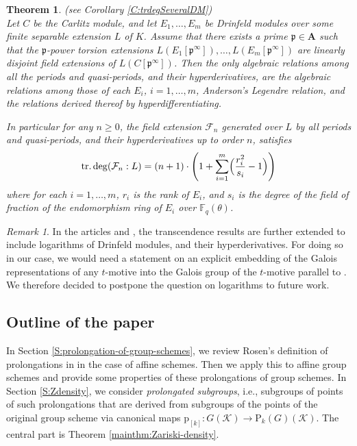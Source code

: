 \documentclass[10pt,a4paper]{amsart}
\theoremstyle{plain} %
\newtheorem{maintheorem}{Theorem}
\theoremstyle{definition}
\theoremstyle{remark}
\newtheorem{Remark}[Theorem]{Remark}
\newcommand{\FF}{\mathbb{F}}
\newcommand{\cK}{\mathcal{K}}   %
\newcommand{\fp}{\mathfrak{p}}  %
\newcommand{\bA}{\mathbf{A}}
\newcommand{\rP}[1]{\mathrm{P}_{\!#1}}
\newcommand{\Fq}{\FF_{\!q}}  %
\newcommand{\trdeg}{\operatorname{tr.deg}}
\newcommand{\prol}[1]{\mathrm{p}_{[#1]}}
\numberwithin{equation}{subsection}
\begin{document}
\begin{maintheorem} (see Corollary \ref{C:trdegSeveralDM})\\ \label{mainthm:severalDMs}
    Let $C$ be the Carlitz module, and let $E_1, \ldots, E_m$ be Drinfeld modules over some finite separable extension $L$ of $K$. Assume that there exists a prime $\fp \in \bA$ such that the $\fp$-power torsion extensions $L(E_1[\fp^\infty]),\dots, L(E_m[\fp^\infty])$ are linearly disjoint field extensions of $L(C[\fp^\infty])$. 
    Then the only algebraic relations among all the periods and quasi-periods, and their hyperderivatives, are the algebraic relations among those of each $E_i$, $i=1,\dots, m$, Anderson's Legendre relation, and the relations derived thereof by hyperdifferentiating.
    
    In particular for any $n\geq 0$, the field extension $\mathcal{F}_n$ generated over $L$ by all periods and quasi-periods, and their hyperderivatives up to order $n$, satisfies
    \[ \trdeg(\mathcal{F}_n:L) = (n+1)\cdot \left( 1 + \sum_{i=1}^m \Bigl(\frac{r_i^2}{s_i} -1 \Bigr) \right) \]
    where for each $i=1,\ldots, m$, $r_i$ is the rank of $E_i$, and $s_i$ is the degree of the field of fraction of the endomorphism ring of $E_i$ over $\Fq(\theta)$.
\end{maintheorem}





\begin{Remark}
    In the articles \cite{cc-mp:aipldm} and \cite{cn:arhpldm}, the transcendence results are further extended to include logarithms of Drinfeld modules, and their hyperderivatives.
    For doing so in our case, we would need a statement on an explicit embedding of the Galois representations of any $t$-motive into the Galois group of the $t$-motive parallel to \cite[Thm.~E]{am:naamcigp}.
    We therefore decided to postpone the question on logarithms to future work. 
\end{Remark}
    


\subsection{Outline of the paper}

In Section \ref{S:prolongation-of-group-schemes}, we review Rosen's definition of prolongations in \cite{er:pda} in the case of affine schemes. Then we apply this to affine group schemes and provide some properties of these prolongations of group schemes.
In Section \ref{S:Zdensity}, we consider \emph{prolongated subgroups}, i.e., subgroups of points of such prolongations that are derived from subgroups of the points of the original group scheme via canonical maps $\prol{k}:G(\cK)\to \rP{k}(G)(\cK)$. The central part is 
Theorem \ref{mainthm:Zariski-density}.
\end{document}

